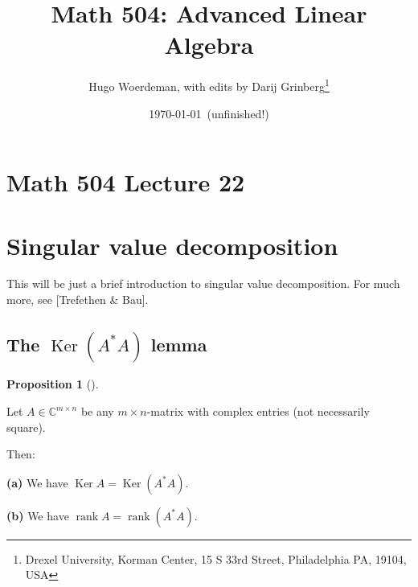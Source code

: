 \documentclass[numbers=enddot,12pt,final,onecolumn,notitlepage]{scrartcl}%
\numberwithin{exer}{subsection}
\theoremstyle{definition}
\newtheorem{prop}[theo]{Proposition}
\newenvironment{proposition}[1][]
{\begin{prop}[#1]\begin{leftbar}}
{\end{leftbar}\end{prop}}
\begin{document}
\title{Math 504: Advanced Linear Algebra}
\author{Hugo Woerdeman, with edits by Darij Grinberg\thanks{Drexel University, Korman
Center, 15 S 33rd Street, Philadelphia PA, 19104, USA}}
\date{\today\ (unfinished!)}
\maketitle
\tableofcontents

\section*{Math 504 Lecture 22}

\section{Singular value decomposition}

This will be just a brief introduction to singular value decomposition. For
much more, see [Trefethen \& Bau].

\subsection{The $\operatorname*{Ker}\left(  A^{\ast}A\right)  $ lemma}

\begin{proposition}
[$\operatorname*{Ker}\left(  A^{\ast}A\right)  $ lemma]Let $A\in
\mathbb{C}^{m\times n}$ be any $m\times n$-matrix with complex entries (not
necessarily square).

Then:

\textbf{(a)} We have $\operatorname*{Ker}A=\operatorname*{Ker}\left(  A^{\ast
}A\right)  $.

\textbf{(b)} We have $\operatorname*{rank}A=\operatorname*{rank}\left(
A^{\ast}A\right)  $.
\end{proposition}
\end{document}
